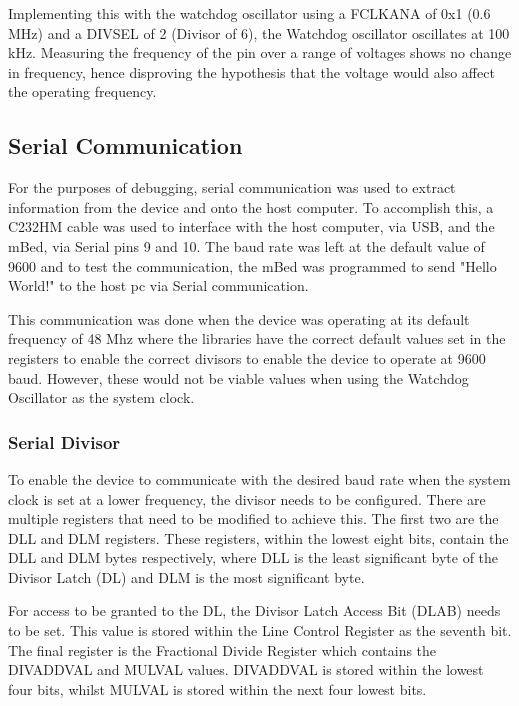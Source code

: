Implementing this with the watchdog oscillator using a FCLKANA of 0x1 (0.6 MHz) and a DIVSEL of 2 (Divisor of 6), the Watchdog oscillator oscillates at 100 kHz. Measuring the frequency of the pin over a range of voltages shows no change in frequency, hence disproving the hypothesis that the voltage would also affect the operating frequency.

\subsection{Serial Communication}

For the purposes of debugging, serial communication was used to extract information from the device and onto the host computer. To accomplish this, a C232HM cable \cite{c232hm_datasheet} was used to interface with the host computer, via USB, and the mBed, via Serial pins 9 and 10. The baud rate was left at the default value of 9600 and to test the communication, the mBed was programmed to send "Hello World!" to the host pc via Serial communication.

This communication was done when the device was operating at its default frequency of 48 Mhz where the libraries have the correct default values set in the registers to enable the correct divisors to enable the device to operate at 9600 baud. However, these would not be viable values when using the Watchdog Oscillator as the system clock.

\subsubsection{Serial Divisor}

To enable the device to communicate with the desired baud rate when the system clock is set at a lower frequency, the divisor needs to be configured. There are multiple registers that need to be modified to achieve this. The first two are the DLL and DLM registers. These registers, within the lowest eight bits, contain the DLL and DLM bytes respectively, where DLL is the least significant byte of the Divisor Latch (DL) and DLM is the most significant byte.

For access to be granted to the DL, the Divisor Latch Access Bit (DLAB) needs to be set. This value is stored within the Line Control Register as the seventh bit. The final register is the Fractional Divide Register which contains the DIVADDVAL and MULVAL values. DIVADDVAL is stored within the lowest four bits, whilst MULVAL is stored within the next four lowest bits. 

